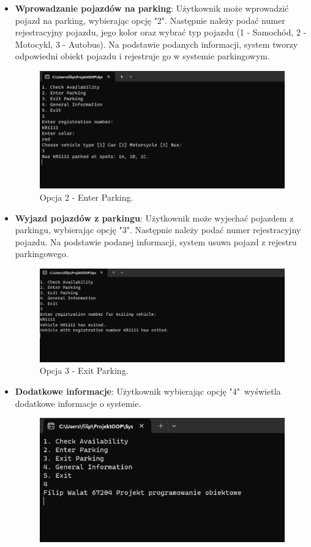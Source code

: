 \documentclass{article}
\begin{document}
\begin{itemize}
    \item \textbf{Wprowadzanie pojazdów na parking}:
    Użytkownik może wprowadzić pojazd na parking, wybierając opcję "2". Następnie należy podać numer rejestracyjny pojazdu, jego kolor oraz wybrać typ pojazdu (1 - Samochód, 2 - Motocykl, 3 - Autobus). Na podstawie podanych informacji, system tworzy odpowiedni obiekt pojazdu i rejestruje go w systemie parkingowym. 
        \begin{figure}[H]
        \centering
        \includegraphics[width=\textwidth]{photos/enter.png}
        \caption{Opcja 2 - Enter Parking.}
        \end{figure}
    \clearpage
    \item \textbf{Wyjazd pojazdów z parkingu}:
    Użytkownik może wyjechać pojazdem z parkingu, wybierając opcję "3". Następnie należy podać numer rejestracyjny pojazdu. Na podstawie podanej informacji, system usuwa pojazd z rejestru parkingowego. 
    \begin{figure}[H]
        \centering
        \includegraphics[width=\textwidth]{photos/exit.png}
        \caption{Opcja 3 - Exit Parking.}
        \end{figure}
    \item \textbf{Dodatkowe informacje}:
    Użytkownik wybierając opcję "4"\ wyświetla dodatkowe informacje o systemie.
        \begin{figure}[H]
        \centering
        \includegraphics[width=\textwidth]{photos/info.png}

\end{figure}
\end{itemize}
\end{document}
